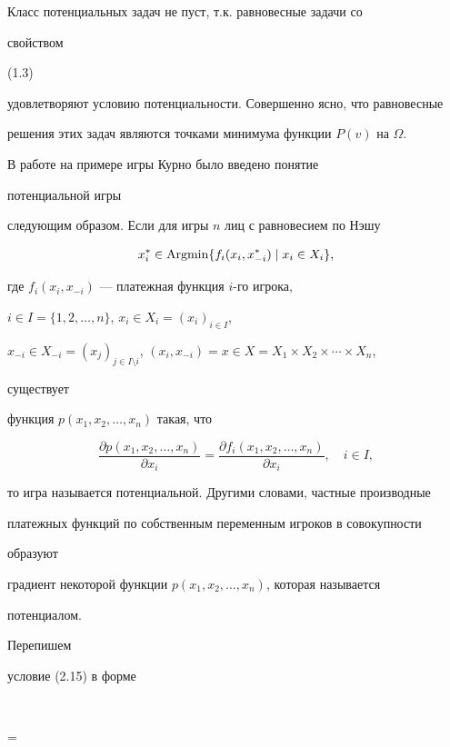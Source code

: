 Класс потенциальных задач не пуст, т.к. равновесные задачи со


свойством


(1.3)


удовлетворяют условию потенциальности. Совершенно ясно, что равновесные


решения этих задач являются точками минимума функции $P(v)$ на $\Omega$.





В работе \cite{Mon} на примере игры Курно было введено понятие


потенциальной игры


следующим образом. Если для игры $n$ лиц с равновесием по Нэшу


$$


x^*_i\in\Argmin\{f_i(x_i,x^*_{-i})\mid x_i\in X_i\},


$$


где $f_i(x_i,x_{-i})$ --- платежная функция $i$-го игрока,


$i\in I=\{1,2,\dotsc,n\}$, $x_i\in X_i=(x_i)_{i\in I}$,


$x_{-i}\in X_{-i}=(x_j)_{j\in I\setminus i}$, $(x_i,x_{-i})=


x\in X=X_1\times X_2\times\dotsb\times X_n$,


существует


функция $p(x_1,x_2,\dotsc,x_n)$ такая, что


\begin{equation}


\frac{\partial p(x_1,x_2,\dotsc,x_n)}{\partial x_i}=


\frac{\partial f_i(x_1,x_2,\dotsc,x_n)}{\partial x_i},


\quad i\in I,


\end{equation}


то игра называется потенциальной. Другими словами, частные производные


платежных функций по собственным переменным игроков в совокупности


образуют


градиент некоторой функции $p(x_1,x_2,\dotsc,x_n)$, которая называется


потенциалом.


Перепишем


условие (2.15) в форме


$$


=


